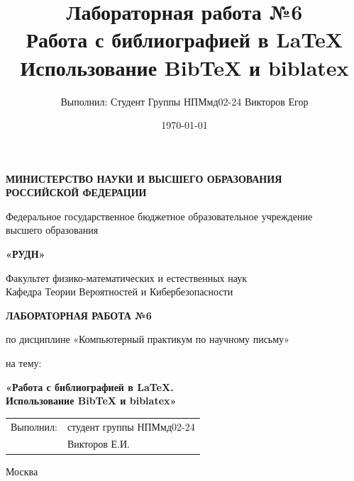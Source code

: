 \documentclass[12pt, a4paper]{article}
\title{
  \textbf{Лабораторная работа №6} \\
  \vspace{0.5cm}
  \Large Работа с библиографией в LaTeX \\
  \large Использование BibTeX и biblatex
}
\author{
  Выполнил: Студент Группы НПМмд02-24 Викторов Егор \\
}
\date{\today}
\begin{document}
\begin{titlepage}
  \centering
  
  \vspace*{2cm}
  
  {\LARGE \textbf{МИНИСТЕРСТВО НАУКИ И ВЫСШЕГО ОБРАЗОВАНИЯ} \\
  \textbf{РОССИЙСКОЙ ФЕДЕРАЦИИ}}
  
  \vspace{0.5cm}
  
  {\large Федеральное государственное бюджетное образовательное учреждение \\
  высшего образования}
  
  \vspace{0.3cm}
  
  {\Large \textbf{«РУДН»}}
  
  \vspace{0.5cm}
  
  {\large Факультет физико-математических и естественных наук \\
  Кафедра Теории Вероятностей и Кибербезопасности}
  
  \vspace{3cm}
  
  {\LARGE \textbf{ЛАБОРАТОРНАЯ РАБОТА №6}}
  
  \vspace{0.5cm}
  
  {\Large по дисциплине «Компьютерный практикум по научному письму»}
  
  \vspace{0.5cm}
  
  {\large на тему:}
  
  \vspace{0.3cm}
  
  {\Large \textbf{«Работа с библиографией в LaTeX. \\
  Использование BibTeX и biblatex»}}
  
  \vfill
  
  \begin{flushright}
    \begin{tabular}{ll}
      Выполнил: & студент группы НПМмд02-24 \\
                & Викторов Е.И. \\
    \end{tabular}
  \end{flushright}
  
  \vspace{2cm}
  
  {\large Москва \\ \the\year}
  
\end{titlepage}
\end{document}
